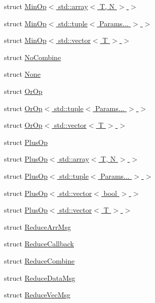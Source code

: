 \begin{DoxyCompactItemize}
struct \hyperlink{structvt_1_1collective_1_1reduce_1_1operators_1_1_min_op_3_01std_1_1array_3_01_t_00_01_n_01_4_01_4}{Min\+Op$<$ std\+::array$<$ T, N $>$ $>$}
\item 
struct \hyperlink{structvt_1_1collective_1_1reduce_1_1operators_1_1_min_op_3_01std_1_1tuple_3_01_params_8_8_8_01_4_01_4}{Min\+Op$<$ std\+::tuple$<$ Params... $>$ $>$}
\item 
struct \hyperlink{structvt_1_1collective_1_1reduce_1_1operators_1_1_min_op_3_01std_1_1vector_3_01_t_01_4_01_4}{Min\+Op$<$ std\+::vector$<$ T $>$ $>$}
\item 
struct \hyperlink{structvt_1_1collective_1_1reduce_1_1operators_1_1_no_combine}{No\+Combine}
\item 
struct \hyperlink{structvt_1_1collective_1_1reduce_1_1operators_1_1_none}{None}
\item 
struct \hyperlink{structvt_1_1collective_1_1reduce_1_1operators_1_1_or_op}{Or\+Op}
\item 
struct \hyperlink{structvt_1_1collective_1_1reduce_1_1operators_1_1_or_op_3_01std_1_1tuple_3_01_params_8_8_8_01_4_01_4}{Or\+Op$<$ std\+::tuple$<$ Params... $>$ $>$}
\item 
struct \hyperlink{structvt_1_1collective_1_1reduce_1_1operators_1_1_or_op_3_01std_1_1vector_3_01_t_01_4_01_4}{Or\+Op$<$ std\+::vector$<$ T $>$ $>$}
\item 
struct \hyperlink{structvt_1_1collective_1_1reduce_1_1operators_1_1_plus_op}{Plus\+Op}
\item 
struct \hyperlink{structvt_1_1collective_1_1reduce_1_1operators_1_1_plus_op_3_01std_1_1array_3_01_t_00_01_n_01_4_01_4}{Plus\+Op$<$ std\+::array$<$ T, N $>$ $>$}
\item 
struct \hyperlink{structvt_1_1collective_1_1reduce_1_1operators_1_1_plus_op_3_01std_1_1tuple_3_01_params_8_8_8_01_4_01_4}{Plus\+Op$<$ std\+::tuple$<$ Params... $>$ $>$}
\item 
struct \hyperlink{structvt_1_1collective_1_1reduce_1_1operators_1_1_plus_op_3_01std_1_1vector_3_01bool_01_4_01_4}{Plus\+Op$<$ std\+::vector$<$ bool $>$ $>$}
\item 
struct \hyperlink{structvt_1_1collective_1_1reduce_1_1operators_1_1_plus_op_3_01std_1_1vector_3_01_t_01_4_01_4}{Plus\+Op$<$ std\+::vector$<$ T $>$ $>$}
\item 
struct \hyperlink{structvt_1_1collective_1_1reduce_1_1operators_1_1_reduce_arr_msg}{Reduce\+Arr\+Msg}
\item 
struct \hyperlink{structvt_1_1collective_1_1reduce_1_1operators_1_1_reduce_callback}{Reduce\+Callback}
\item 
struct \hyperlink{structvt_1_1collective_1_1reduce_1_1operators_1_1_reduce_combine}{Reduce\+Combine}
\item 
struct \hyperlink{structvt_1_1collective_1_1reduce_1_1operators_1_1_reduce_data_msg}{Reduce\+Data\+Msg}
\item 
struct \hyperlink{structvt_1_1collective_1_1reduce_1_1operators_1_1_reduce_vec_msg}{Reduce\+Vec\+Msg}
\end{DoxyCompactItemize}
